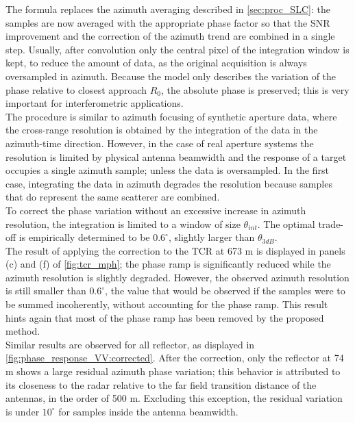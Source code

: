The formula replaces the azimuth averaging described in \autoref{sec:proc_SLC}: the samples are now averaged with the appropriate phase factor so that the SNR improvement and the correction of the azimuth trend are combined in a single step. Usually, after convolution only the central pixel of the integration window is kept, to reduce the amount of data, as the original acquisition is always oversampled in azimuth. Because the model only describes the variation of the phase relative to closest approach $R_{0}$, the absolute phase is preserved; this is very important for interferometric applications.\\
The procedure is similar to azimuth focusing of synthetic aperture data, where the cross-range resolution is obtained by the integration of the data in the azimuth-time direction. However, in the case of real aperture systems the resolution is limited by physical antenna beamwidth and the response of a target  occupies a single azimuth sample; unless the data is oversampled. In the first case, integrating the data in azimuth degrades the resolution because samples that do represent the same scatterer are combined.\\ To correct the phase variation without an excessive increase in azimuth resolution, the integration is limited to a window of size $\theta_{int}$. The optimal trade-off is empirically determined to be $0.6^\circ$, slightly larger than $\theta_{3dB}$.\\
The result of applying the correction to the TCR at 673 m is displayed in panels (c) and (f) of \autoref{fig:tcr_mph}; the phase ramp is significantly reduced while the azimuth resolution is slightly degraded. However, the observed azimuth resolution is still smaller than $0.6^\circ$, the value that would be observed if the samples were to be summed incoherently, without accounting for the phase ramp. This result hints again that  most of the phase ramp has been removed by the proposed method.\\
Similar results are observed for all reflector, as displayed in \autoref{fig:phase_response_VV:corrected}.  After the correction, only the reflector at 74 m shows a large residual azimuth phase variation; this behavior is attributed to its closeness to the radar relative to the far field transition distance of the antennas, in the order of 500 m. Excluding this exception, the residual variation is under $10^\circ$ for samples inside the antenna beamwidth.
